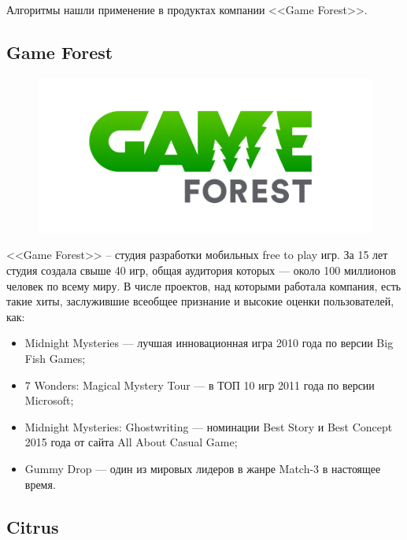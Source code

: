 \documentclass{fefu_thesis/cls/fefu}
\begin{document}
    Алгоритмы нашли применение в продуктах компании <<Game Forest>>.

    \subsection{Game Forest}

    \begin{figure}[H]
        \centering
        \includegraphics[scale=0.25]{images/GF.png}
    \end{figure}

    <<Game Forest>> -- студия разработки мобильных free to play игр. За 15 лет студия создала свыше 40 игр, общая аудитория которых —  около 100 миллионов человек по всему миру. В числе проектов, над которыми работала компания, есть такие хиты, заслужившие всеобщее признание и высокие оценки пользователей, как:

    \begin{itemize}
      \item Midnight Mysteries --- лучшая инновационная игра 2010 года по версии Big Fish Games;
      \item 7 Wonders: Magical Mystery Tour — в ТОП 10 игр 2011 года по версии Microsoft;
      \item Midnight Mysteries: Ghostwriting --- номинации Best Story и Best Concept 2015 года от сайта All About Casual Game;
      \item Gummy Drop --- один из мировых лидеров в жанре Match-3 в настоящее время.
    \end{itemize}

    \subsection{Citrus}
\end{document}
